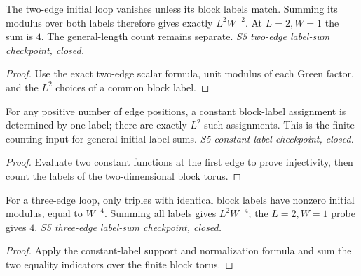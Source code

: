 \begin{lemma}
  \label{lem:loop-initial-label-sum}
  \leanok
  The two-edge initial loop vanishes unless its block labels match.
  Summing its modulus over both labels therefore gives exactly
  $L^2W^{-2}$. At $L=2,W=1$ the sum is $4$. The general-length count
  remains separate. \emph{S5 two-edge label-sum checkpoint, closed.}
\end{lemma}
\begin{proof}\leanok
  Use the exact two-edge scalar formula, unit modulus of each Green
  factor, and the $L^2$ choices of a common block label.
\end{proof}

\begin{lemma}
  \label{lem:loop-initial-constant-count}
  \leanok
  For any positive number of edge positions, a constant block-label
  assignment is determined by one label; there are exactly $L^2$ such
  assignments. This is the finite counting input for general initial
  label sums. \emph{S5 constant-label checkpoint, closed.}
\end{lemma}
\begin{proof}\leanok
  Evaluate two constant functions at the first edge to prove injectivity,
  then count the labels of the two-dimensional block torus.
\end{proof}

\begin{lemma}
  \label{lem:loop-initial-three-label-sum}
  \leanok
  For a three-edge loop, only triples with identical block labels have
  nonzero initial modulus, equal to $W^{-4}$. Summing all labels gives
  $L^2W^{-4}$; the $L=2,W=1$ probe gives $4$.
  \emph{S5 three-edge label-sum checkpoint, closed.}
\end{lemma}
\begin{proof}\leanok
  Apply the constant-label support and normalization formula and sum
  the two equality indicators over the finite block torus.
\end{proof}


